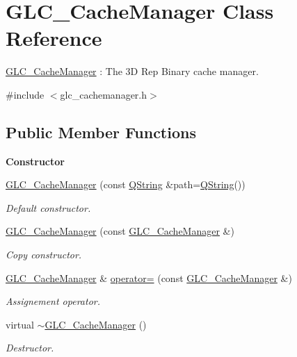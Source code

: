 \hypertarget{class_g_l_c___cache_manager}{\section{G\-L\-C\-\_\-\-Cache\-Manager Class Reference}
\label{class_g_l_c___cache_manager}
}


\hyperlink{class_g_l_c___cache_manager}{G\-L\-C\-\_\-\-Cache\-Manager} \-: The 3\-D Rep Binary cache manager.  




{\ttfamily \#include $<$glc\-\_\-cachemanager.\-h$>$}

\subsection*{Public Member Functions}
\begin{Indent}{\bf Constructor}\par
\begin{DoxyCompactItemize}
\item 
\hyperlink{class_g_l_c___cache_manager_a31748b2d082c398163ac2252f67649d9}{G\-L\-C\-\_\-\-Cache\-Manager} (const \hyperlink{group___u_a_v_objects_plugin_gab9d252f49c333c94a72f97ce3105a32d}{Q\-String} \&path=\hyperlink{group___u_a_v_objects_plugin_gab9d252f49c333c94a72f97ce3105a32d}{Q\-String}())
\begin{DoxyCompactList}\small\item\em Default constructor. \end{DoxyCompactList}\item 
\hyperlink{class_g_l_c___cache_manager_a5cf1ecda63767af6265e4653df614d2a}{G\-L\-C\-\_\-\-Cache\-Manager} (const \hyperlink{class_g_l_c___cache_manager}{G\-L\-C\-\_\-\-Cache\-Manager} \&)
\begin{DoxyCompactList}\small\item\em Copy constructor. \end{DoxyCompactList}\item 
\hyperlink{class_g_l_c___cache_manager}{G\-L\-C\-\_\-\-Cache\-Manager} \& \hyperlink{class_g_l_c___cache_manager_a43f425908abc42cff7a66193cad3b710}{operator=} (const \hyperlink{class_g_l_c___cache_manager}{G\-L\-C\-\_\-\-Cache\-Manager} \&)
\begin{DoxyCompactList}\small\item\em Assignement operator. \end{DoxyCompactList}\item 
virtual \hyperlink{class_g_l_c___cache_manager_a15fb993f58bf60f4d8ef1aa253bd3db9}{$\sim$\-G\-L\-C\-\_\-\-Cache\-Manager} ()
\begin{DoxyCompactList}\small\item\em Destructor. \end{DoxyCompactList}\end{DoxyCompactItemize}
\end{Indent}
